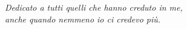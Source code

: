 \newpage\null\thispagestyle{empty}\newpage %
\thispagestyle{empty}
\begin{flushright}
\null{}
{\emph{Dedicato a tutti quelli che hanno creduto in me,\\ anche quando nemmeno io ci credevo più.}}
\null
\end{flushright}